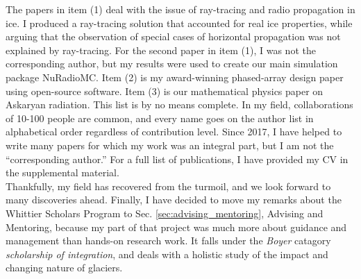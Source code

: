 \documentclass[../../main.tex]{subfiles}
\begin{document}
The papers in item (1) deal with the issue of ray-tracing and radio propagation in ice.  I produced a ray-tracing solution that accounted for real ice properties, while arguing that the observation of special cases of horizontal propagation was not explained by ray-tracing.  For the second paper in item (1), I was not the corresponding author, but my results were used to create our main simulation package NuRadioMC.  Item (2) is my award-winning phased-array design paper using open-source software.  Item (3) is our mathematical physics paper on Askaryan radiation.  This list is by no means complete.  In my field, collaborations of 10-100 people are common, and every name goes on the author list in alphabetical order regardless of contribution level.  Since 2017, I have helped to write many papers for which my work was an integral part, but I am not the ``corresponding author.''  For a full list of publications, I have provided my CV in the supplemental material.
\\
\vspace{0.25cm}
Thankfully, my field has recovered from the turmoil, and we look forward to many discoveries ahead.  Finally, I have decided to move my remarks about the Whittier Scholars Program to Sec. \ref{sec:advising_mentoring}, Advising and Mentoring, because my part of that project was much more about guidance and management than hands-on research work.  It falls under the \textit{Boyer} catagory \textit{scholarship of integration}, and deals with a holistic study of the impact and changing nature of glaciers.
\end{document}
